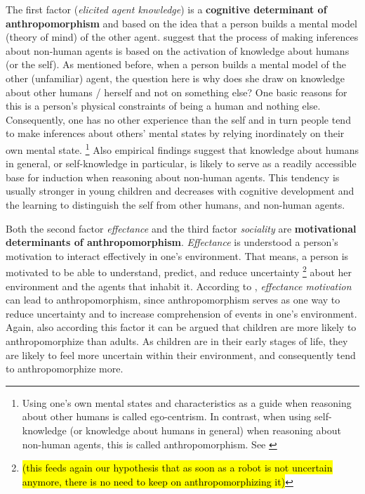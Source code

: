 \documentclass{frontiersSCNS} %
\begin{document}
The first factor (\textit{elicited agent knowledge}) is a \textbf{cognitive determinant of anthropomorphism} and based on the idea that a person builds a mental model (theory of mind) of the other agent. \cite{epley_seeing_2007} suggest that the process of making inferences about non-human agents is based on the activation of knowledge about humans (or the self). As mentioned before, when a person builds a mental model of the other (unfamiliar) agent, the question here is why does she draw on knowledge about other humans / herself and not on something else? One basic reasons for this is a person's physical constraints of being a human and nothing else. Consequently, one has no other experience than the self and in turn people tend to make inferences about others' mental states by relying inordinately on their own mental state. \footnote{Using one's own mental states and characteristics as a guide when reasoning about other humans is called ego-centrism. In contrast, when using self-knowledge (or knowledge about humans in general) when reasoning about non-human agents, this is called anthropomorphism. See \cite{epley_seeing_2007}} Also empirical findings suggest that knowledge about humans in general, or self-knowledge in particular, is likely to serve as a readily accessible base for induction when reasoning about non-human agents. This tendency is usually stronger in young children and decreases with cognitive development and the learning to distinguish the self from other humans, and non-human agents. 
	
Both the second factor \textit{effectance} and the third factor \textit{sociality} are \textbf{motivational determinants of anthropomorphism}. \textit{Effectance} is understood a person's motivation to interact effectively in one's environment. That means, a person is motivated to be able to understand, predict, and reduce uncertainty \footnote{\hl{(this feeds again our hypothesis that as soon as a robot is not uncertain anymore, there is no need to keep on anthropomorphizing it)}} about her environment and the agents that inhabit it. According to \cite{epley_seeing_2007}, \textit{effectance motivation} can lead to anthropomorphism, since anthropomorphism serves as one way to reduce uncertainty and to increase comprehension of events in one's environment. Again, also according this factor it can be argued that children are more likely to anthropomorphize than adults. As children are in their early stages of life, they are likely to feel more uncertain within their environment, and consequently tend to anthropomorphize more.
\end{document}
